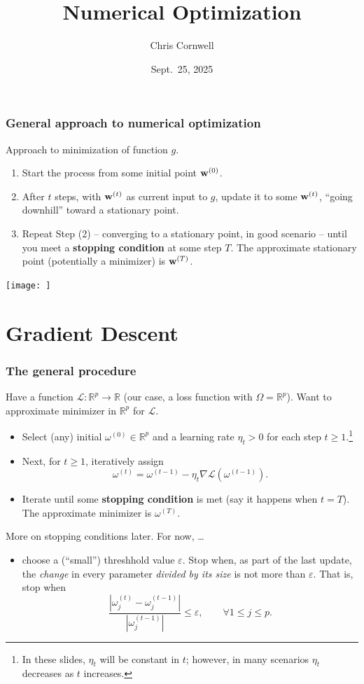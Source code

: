 \documentclass{beamer}
\author{Chris Cornwell}
\date{Sept.~25, 2025}
\title{Numerical Optimization}
\theoremstyle{example}
\begin{document}
\begin{frame}
\titlepage
\end{frame}

\begin{frame}
\frametitle{General approach to numerical optimization}
    Approach to minimization of function $g$. 

    \pause
    \begin{enumerate}
        \item Start the process from some initial point ${\bf w}^{(0)}$.
        \pause
        \item After $t$ steps, with ${\bf w}^{(t)}$ as current input to $g$, update it to some ${\bf w}^{(t)}$, ``going downhill'' toward a stationary point. 
        \pause
        \item Repeat Step (2) {--} converging to a stationary point, in good scenario {--} until you meet a \textbf{stopping condition} at some step $T$. The approximate stationary point (potentially a minimizer) is ${\bf w}^{(T)}$.
    \end{enumerate}
    
    \centering 
    \texttt{[image: ]}
\end{frame}

\section{Gradient Descent}

\begin{frame}
\frametitle{The general procedure}
    Have a function $\mathcal L:\mathbb R^p \to \mathbb R$ (our case, a loss function with $\Omega=\mathbb R^p$). Want to approximate minimizer in $\mathbb R^p$ for $\mathcal L$. 

    \pause
    \begin{itemize}
        \item Select (any) initial $\omega^{(0)}\in \mathbb R^p$ and a learning rate $\eta_t > 0$ for each step $t\ge 1$.\footnote{In these slides, $\eta_t$ will be constant in $t$; however, in many scenarios $\eta_t$ decreases as $t$ increases.} 
        \pause
        \item Next, for $t\ge 1$, iteratively assign
        \[\omega^{(t)} = \omega^{(t-1)} - \eta_t\nabla\mathcal L(\omega^{(t-1)}).\]
        \pause
        \item Iterate until some \textbf{stopping condition} is met (say it happens when $t = T$). The approximate minimizer is $\omega^{(T)}$.
    \end{itemize}

    \pause
    More on stopping conditions later. For now, \ldots 
    \pause
    \begin{itemize}
        \item choose a (``small'') threshhold value $\varepsilon$. Stop when, as part of the last update, the \emph{change} in every parameter \emph{divided by its size} is not more than $\varepsilon$. \pause That is, stop when 
        {\small
        \[\frac{|\omega^{(t)}_j - \omega^{(t-1)}_j|}{|\omega^{(t-1)}_j|} \le \varepsilon,\qquad \forall 1\le j\le p.\]
        }
    \end{itemize}
\end{frame}
\end{document}
